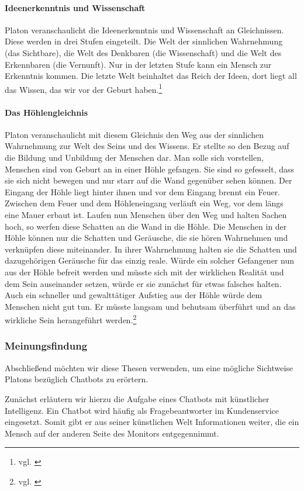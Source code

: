 \paragraph{Ideenerkenntnis und Wissenschaft}
Platon veranschaulicht die Ideenerkenntnis und Wissenschaft an Gleichnissen. Diese werden in drei Stufen eingeteilt. Die Welt der sinnlichen Wahrnehmung (das Sichtbare), die Welt des Denkbaren (die Wissenschaft) und die Welt des Erkennbaren (die Vernunft). Nur in der letzten Stufe kann ein Mensch zur Erkenntnis kommen. Die letzte Welt beinhaltet das Reich der Ideen, dort liegt all das Wissen, das wir vor der Geburt haben.\footnote{vgl. \cite{Platon6} \cite{Platon4}}

\paragraph{Das Höhlengleichnis}
Platon veranschaulicht mit diesem Gleichnis den Weg aus der sinnlichen Wahrnehmung zur Welt des Seins und des Wissens. Er stellte so den Bezug auf die Bildung und Unbildung der Menschen dar.
Man solle sich vorstellen,  Menschen sind von Geburt an in einer Höhle gefangen. Sie sind so gefesselt, dass sie sich nicht bewegen und nur starr auf die Wand gegenüber sehen können. Der Eingang der Höhle liegt hinter ihnen und vor dem Eingang brennt ein Feuer. Zwischen dem Feuer und dem Höhleneingang verläuft ein Weg, vor dem längs eine Mauer erbaut ist. Laufen nun Menschen über den Weg und halten Sachen hoch, so werfen diese Schatten an die Wand in die Höhle. Die Menschen in der Höhle können nur die Schatten und Geräusche, die sie hören Wahrnehmen und verknüpfen diese miteinander. In ihrer Wahrnehmung halten sie die Schatten und dazugehörigen Geräusche für das einzig reale. Würde ein solcher Gefangener nun aus der Höhle befreit werden und müsste sich mit der wirklichen Realität und dem Sein auseinander setzen, würde er sie zunächst für etwas falsches halten. Auch ein schneller und gewalttätiger Aufstieg aus der Höhle würde dem Menschen nicht gut tun. Er müsste langsam und behutsam überführt und an das wirkliche Sein herangeführt werden.\footnote{vgl. \cite{Politeia}}
	
\subsubsection{Meinungsfindung}
Abschließend möchten wir diese Thesen verwenden, um eine mögliche Sichtweise Platons bezüglich Chatbots zu erörtern.

Zunächst erläutern wir hierzu die Aufgabe eines Chatbots mit künstlicher Intelligenz. Ein Chatbot wird häufig als Fragebeantworter im Kundenservice eingesetzt. Somit gibt er aus seiner künstlichen Welt Informationen weiter, die ein Mensch auf der anderen Seite des Monitors entgegennimmt.

